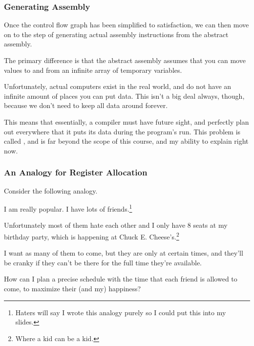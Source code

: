 \documentclass[aspectratio=169]{beamer}
\begin{document}
\begin{frame}[fragile]
  \frametitle{Generating Assembly}

  Once the control flow graph has been simplified to satisfaction, we can
  then move on to the step of generating actual assembly instructions from
  the abstract assembly.

  \pause
  \vspace{\fill}

  The primary difference is that the abstract assembly assumes that you can
  move values to and from an infinite array of temporary variables.

  \pause
  \vspace{\fill}

  Unfortunately, actual computers exist in the real world, and do not have
  an infinite amount of places you can put data. This isn't a big deal always,
  though, because we don't need to keep all data around forever.

  \pause
  \vspace{\fill}

  This means that essentially, a compiler must have future sight, and perfectly
  plan out everywhere that it puts its data during the program's run. This
  problem is called , and is far beyond the
  scope of this course, and my ability to explain right now.
\end{frame}


\begin{frame}[fragile]
  \frametitle{An Analogy for Register Allocation}

  Consider the following analogy.

  \pause
  \vspace{\fill}

  I am really popular. I have lots of friends.\footnote<2->{Haters will say I wrote
  this analogy purely so I could put this into my slides.}

  \pause
  \vspace{\fill}

  Unfortunately most of them hate each other and I only have 8 seats at
  my birthday party, which is happening at Chuck E. Cheese's.\footnote<3->{Where a kid can be a kid.}

  \pause
  \vspace{\fill}

  I want as many of them to come, but they are  only 
  at certain times, and they'll be cranky if they can't be there for the full time
  they're available.

  \pause
  \vspace{\fill}

  How can I plan a precise schedule with the time that each friend is allowed to
  come, to maximize their (and my) happiness?
\end{frame}
\end{document}
